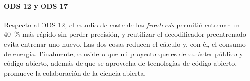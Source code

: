 \paragraph{ODS 12 y ODS 17} Respecto al ODS 12, el estudio de coste de los \textit{frontends} permitió entrenar un 40~\% más rápido sin perder precisión, y reutilizar el decodificador preentrenado evita entrenar uno nuevo. Las dos cosas reducen el cálculo y, con él, el consumo de energía. Finalmente, considero que mi proyecto que es de carácter público y código abierto, además de que se aprovecha de tecnologías de código abierto, promueve la colaboración de la ciencia abierta.
